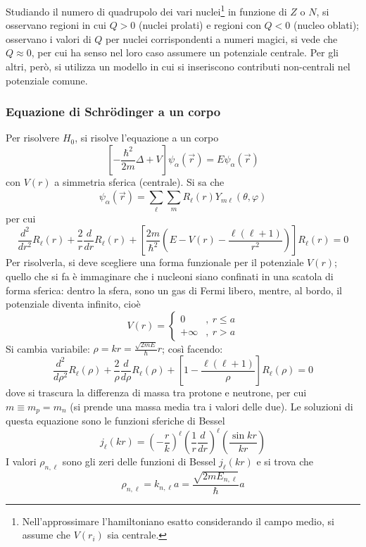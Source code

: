 \documentclass[11pt, a4paper]{scrartcl}
\theoremstyle{style}
\numberwithin{equation}{subsection}
\begin{document}
Studiando il numero di quadrupolo dei vari nuclei\footnote{Nell'approssimare l'hamiltoniano esatto considerando il campo medio, si assume che $V(r_i)$ sia centrale.} in funzione di $Z$ o $N$, si osservano regioni in cui $Q > 0$ (nuclei prolati) e regioni con $Q<0$ (nucleo oblati); osservano i valori di $Q$ per nuclei corrispondenti a numeri magici, si vede che $Q\approx 0$, per cui ha senso nel loro caso assumere un potenziale centrale.
Per gli altri, per\`o, si utilizza un modello in cui si inseriscono contributi non-centrali nel potenziale comune.

\subsubsection{Equazione di Schr\"odinger a un corpo}

Per risolvere $H_0$, si risolve l'equazione a un corpo
\[
	\left[ -\frac{\hbar ^2}{2m} \Delta + V \right]  \psi _\alpha (\vec{r}) = E \psi _\alpha (\vec{r})
\] 
con $V(r)$ a simmetria sferica (centrale).
Si sa che 
\[
\psi _\alpha (\vec{r}) = \sum_{\ell }^{} \sum_{m}^{} R_\ell (r) Y_{m\ell } (\theta ,\varphi )
\] 
per cui 
\[
\frac{d ^2}{d r^2} R_\ell (r) + \frac{2}{r} \frac{d }{d r} R_\ell (r) + \left[ \frac{2m}{\hbar ^2}\left(E - V(r) - \frac{\ell (\ell +1)}{r^2}\right)  \right] R_\ell (r) = 0
\] 
Per risolverla, si deve scegliere una forma funzionale per il potenziale $V(r)$; quello che si fa \`e immaginare che i nucleoni siano confinati in una scatola di forma sferica: dentro la sfera, sono un gas di Fermi libero, mentre, al bordo, il potenziale diventa infinito, cio\`e 
\[
V(r) = \begin{cases}
	0 &,\ r\le a\\
	+\infty &,\ r> a
\end{cases}
\] 
Si cambia variabile: $\rho  = kr = \frac{\sqrt{2mE} }{\hbar }r$; cos\`i facendo:
\[
\frac{d ^2}{d \rho ^2}  R_\ell (\rho ) + \frac{2}{\rho } \frac{d }{d \rho }  R_\ell (\rho ) + \left[ 1 - \frac{\ell (\ell +1)}{\rho } \right] R_\ell (\rho ) = 0
\] 
dove si trascura la differenza di massa tra protone e neutrone, per cui $m \equiv m_p = m_n$ (si prende una massa media tra i valori delle due).
Le soluzioni di questa equazione sono le funzioni sferiche di Bessel
\[
j_\ell (kr) = \left(-\frac{r}{k}\right) ^{\ell } \left(\frac{1}{r}\frac{d }{d r} \right) ^{\ell } \left(\frac{\sin kr}{kr}\right) 
\] 
I valori $\rho _{n,\ell }$ sono gli zeri delle funzioni di Bessel $j_\ell (kr)$ e si trova che
\[
\rho _{n,\ell } = k_{n,\ell } a = \frac{\sqrt{2m E_{n,\ell }} }{\hbar }a
\] 
\end{document}
